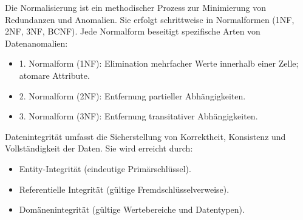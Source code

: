 Die Normalisierung ist ein methodischer Prozess zur Minimierung von Redundanzen und Anomalien.
Sie erfolgt schrittweise in Normalformen (1NF, 2NF, 3NF, BCNF). Jede Normalform beseitigt spezifische Arten von Datenanomalien:

\begin{itemize}

\item
1. Normalform (1NF): Elimination mehrfacher Werte innerhalb einer Zelle; atomare Attribute.
\item
2. Normalform (2NF): Entfernung partieller Abhängigkeiten.
\item
3. Normalform (3NF): Entfernung transitativer Abhängigkeiten.
\end{itemize}

Datenintegrität umfasst die Sicherstellung von Korrektheit, Konsistenz und Vollständigkeit der Daten. Sie wird erreicht durch:

\begin{itemize}
\item
Entity-Integrität (eindeutige Primärschlüssel).
\item
Referentielle Integrität (gültige Fremdschlüsselverweise).

\item
Domänenintegrität (gültige Wertebereiche und Datentypen).
\end{itemize}
